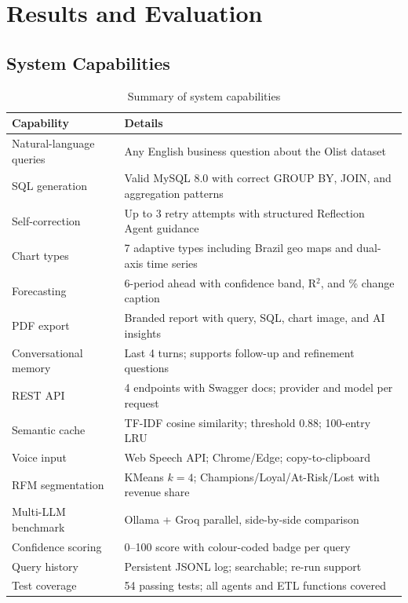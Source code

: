 \documentclass[12pt,a4paper]{report}
\begin{document}
\chapter{Results and Evaluation}
\label{ch:results}

\section{System Capabilities}

\begin{table}[H]
  \centering
  \caption{Summary of system capabilities}
  \label{tab:capabilities}
  \renewcommand{\arraystretch}{1.3}
  \begin{tabularx}{\textwidth}{lX}
    \toprule
    \textbf{Capability} & \textbf{Details} \\
    \midrule
    Natural-language queries & Any English business question about the Olist dataset \\
    SQL generation           & Valid MySQL 8.0 with correct GROUP BY, JOIN, and aggregation patterns \\
    Self-correction          & Up to 3 retry attempts with structured Reflection Agent guidance \\
    Chart types              & 7 adaptive types including Brazil geo maps and dual-axis time series \\
    Forecasting              & 6-period ahead with confidence band, R$^2$, and \% change caption \\
    PDF export               & Branded report with query, SQL, chart image, and AI insights \\
    Conversational memory    & Last 4 turns; supports follow-up and refinement questions \\
    REST API                 & 4 endpoints with Swagger docs; provider and model per request \\
    Semantic cache           & TF-IDF cosine similarity; threshold 0.88; 100-entry LRU \\
    Voice input              & Web Speech API; Chrome/Edge; copy-to-clipboard \\
    RFM segmentation         & KMeans $k=4$; Champions/Loyal/At-Risk/Lost with revenue share \\
    Multi-LLM benchmark      & Ollama + Groq parallel, side-by-side comparison \\
    Confidence scoring       & 0--100 score with colour-coded badge per query \\
    Query history            & Persistent JSONL log; searchable; re-run support \\
    Test coverage            & 54 passing tests; all agents and ETL functions covered \\
    \bottomrule
  \end{tabularx}
\end{table}
\end{document}
